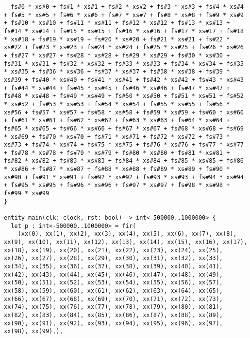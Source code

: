 \documentclass[msc,lith,english]{liuthesis}
\begin{document}
\begin{verbatim}
  fs#0 * xs#0 + fs#1 * xs#1 + fs#2 * xs#2 + fs#3 * xs#3 + fs#4 * xs#4 + fs#5 * xs#5 + fs#6 * xs#6 + fs#7 * xs#7 + fs#8 * xs#8 + fs#9 * xs#9 + fs#10 * xs#10 + fs#11 * xs#11 + fs#12 * xs#12 + fs#13 * xs#13 + fs#14 * xs#14 + fs#15 * xs#15 + fs#16 * xs#16 + fs#17 * xs#17 + fs#18 * xs#18 + fs#19 * xs#19 + fs#20 * xs#20 + fs#21 * xs#21 + fs#22 * xs#22 + fs#23 * xs#23 + fs#24 * xs#24 + fs#25 * xs#25 + fs#26 * xs#26 + fs#27 * xs#27 + fs#28 * xs#28 + fs#29 * xs#29 + fs#30 * xs#30 + fs#31 * xs#31 + fs#32 * xs#32 + fs#33 * xs#33 + fs#34 * xs#34 + fs#35 * xs#35 + fs#36 * xs#36 + fs#37 * xs#37 + fs#38 * xs#38 + fs#39 * xs#39 + fs#40 * xs#40 + fs#41 * xs#41 + fs#42 * xs#42 + fs#43 * xs#43 + fs#44 * xs#44 + fs#45 * xs#45 + fs#46 * xs#46 + fs#47 * xs#47 + fs#48 * xs#48 + fs#49 * xs#49 + fs#50 * xs#50 + fs#51 * xs#51 + fs#52 * xs#52 + fs#53 * xs#53 + fs#54 * xs#54 + fs#55 * xs#55 + fs#56 * xs#56 + fs#57 * xs#57 + fs#58 * xs#58 + fs#59 * xs#59 + fs#60 * xs#60 + fs#61 * xs#61 + fs#62 * xs#62 + fs#63 * xs#63 + fs#64 * xs#64 + fs#65 * xs#65 + fs#66 * xs#66 + fs#67 * xs#67 + fs#68 * xs#68 + fs#69 * xs#69 + fs#70 * xs#70 + fs#71 * xs#71 + fs#72 * xs#72 + fs#73 * xs#73 + fs#74 * xs#74 + fs#75 * xs#75 + fs#76 * xs#76 + fs#77 * xs#77 + fs#78 * xs#78 + fs#79 * xs#79 + fs#80 * xs#80 + fs#81 * xs#81 + fs#82 * xs#82 + fs#83 * xs#83 + fs#84 * xs#84 + fs#85 * xs#85 + fs#86 * xs#86 + fs#87 * xs#87 + fs#88 * xs#88 + fs#89 * xs#89 + fs#90 * xs#90 + fs#91 * xs#91 + fs#92 * xs#92 + fs#93 * xs#93 + fs#94 * xs#94 + fs#95 * xs#95 + fs#96 * xs#96 + fs#97 * xs#97 + fs#98 * xs#98 + fs#99 * xs#99
}

entity main(clk: clock, rst: bool) -> int<-500000..1000000> {
  let p : int<-500000..1000000> = fir(
    (xx(0), xx(1), xx(2), xx(3), xx(4), xx(5), xx(6), xx(7), xx(8), xx(9), xx(10), xx(11), xx(12), xx(13), xx(14), xx(15), xx(16), xx(17), xx(18), xx(19), xx(20), xx(21), xx(22), xx(23), xx(24), xx(25), xx(26), xx(27), xx(28), xx(29), xx(30), xx(31), xx(32), xx(33), xx(34), xx(35), xx(36), xx(37), xx(38), xx(39), xx(40), xx(41), xx(42), xx(43), xx(44), xx(45), xx(46), xx(47), xx(48), xx(49), xx(50), xx(51), xx(52), xx(53), xx(54), xx(55), xx(56), xx(57), xx(58), xx(59), xx(60), xx(61), xx(62), xx(63), xx(64), xx(65), xx(66), xx(67), xx(68), xx(69), xx(70), xx(71), xx(72), xx(73), xx(74), xx(75), xx(76), xx(77), xx(78), xx(79), xx(80), xx(81), xx(82), xx(83), xx(84), xx(85), xx(86), xx(87), xx(88), xx(89), xx(90), xx(91), xx(92), xx(93), xx(94), xx(95), xx(96), xx(97), xx(98), xx(99),),


\end{verbatim}
\end{document}
